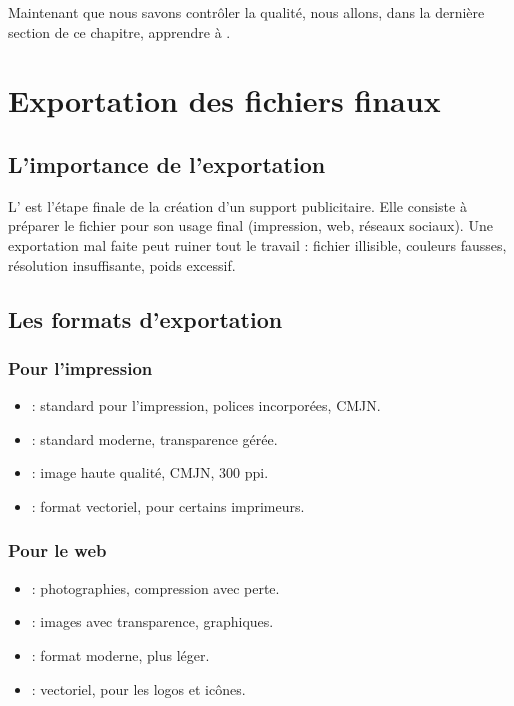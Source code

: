 Maintenant que nous savons contrôler la qualité, nous allons, dans la dernière section de ce chapitre, apprendre à .

\section{Exportation des fichiers finaux}

\subsection{L'importance de l'exportation}

L' est l'étape finale de la création d'un support publicitaire. Elle consiste à préparer le fichier pour son usage final (impression, web, réseaux sociaux). Une exportation mal faite peut ruiner tout le travail : fichier illisible, couleurs fausses, résolution insuffisante, poids excessif.

\subsection{Les formats d'exportation}

\subsubsection{Pour l'impression}

\begin{itemize}
    \item {} : standard pour l'impression, polices incorporées, CMJN.
    \item {} : standard moderne, transparence gérée.
    \item {} : image haute qualité, CMJN, 300 ppi.
    \item {} : format vectoriel, pour certains imprimeurs.
\end{itemize}

\subsubsection{Pour le web}

\begin{itemize}
    \item {} : photographies, compression avec perte.
    \item {} : images avec transparence, graphiques.
    \item {} : format moderne, plus léger.
    \item {} : vectoriel, pour les logos et icônes.
\end{itemize}

